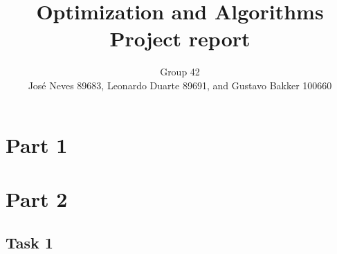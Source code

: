\documentclass[12pt]{article}
\title{Optimization and Algorithms \\ Project report}
\author{Group 42 \\ Jos{\'e} Neves 89683, Leonardo Duarte 89691, and Gustavo Bakker 100660}
\date{}
\begin{document}
\maketitle

\section{Part 1}

\section{Part 2}

\subsection{Task 1}
\end{document}
